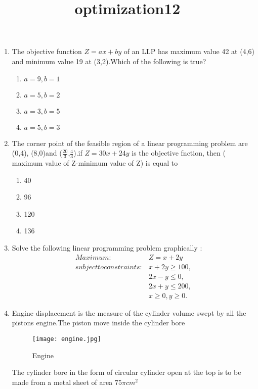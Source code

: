 \documentclass[10pt,a4paper]{article}
\def\mytitle{optimization12}
\begin{document}
\title{\mytitle}
\date{}
\maketitle
\begin{enumerate}
	\item The objective function $Z = ax+by$ of an LLP has maximum value 42 at (4,6) and minimum value 19 at (3,2).Which of the following is true?
		
  		\begin{enumerate}
				\item $a=9,b=1$
		        	\item $a=5,b=2$
				\item $a= 3,b=5$
				\item $a=5,b=3$
			
		\end{enumerate}
		
	\item The corner point of the feasible region of a linear programming problem are (0,4), (8,0)and ($\frac{20}{3}$,$\frac{4}{3}$).if $ Z=30x+24y $ is the objective fnction, then ( maximum value of Z-minimum value of Z) is equal to 
		
		\begin{enumerate}
				\item 40
				\item 96
				\item 120
				\item 136
		\end{enumerate}
		
		
	\item 
	 Solve the following linear programming problem graphically :
\begin{align}
	Maximum:& Z=x+2y \nonumber \\
	subject to constraints 
	     :& x+2y\ge100 ,\nonumber\\
             &  2x-y\le0 ,\nonumber\\
	     &  2x+y\le200 ,\nonumber\\
   	     &   x\ge0 ,y\ge0 .\nonumber
\end{align}
				

			      \item
		Engine displacement is the measure of the cylinder volume swept by all the pistons engine.The piston move inside the cylinder bore \\
		
		\begin{figure}[htbp]
	\texttt{[image: engine.jpg]}\\
			\caption{Engine}
			\label{fig:pic}  \end{figure}
		The cylinder bore in the form of circular cylinder open at the top is to be made from a metal sheet of area $ 75 \pi cm^2 $ \\
 	

\end{enumerate}
\end{document}
